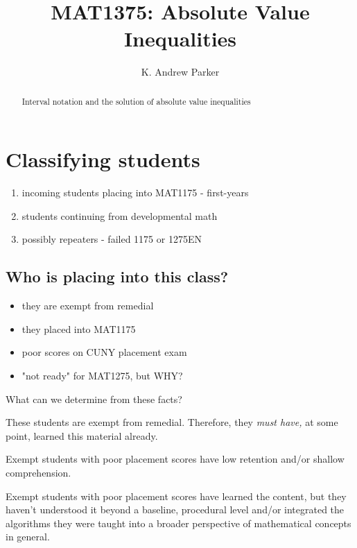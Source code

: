 \documentclass{ximera}
\title{MAT1375: Absolute Value Inequalities}
\author{K. Andrew Parker}
\begin{document}
\begin{abstract}
Interval notation and the solution of absolute value inequalities
\end{abstract}

\maketitle



\section{Classifying students}

\begin{enumerate}
\item incoming students placing into MAT1175 - first-years
\item students continuing from developmental math
\item possibly repeaters - failed 1175 or 1275EN
\end{enumerate}

\subsection{Who is placing into this class?}

\begin{itemize}
\item they are exempt from remedial
\item they placed into MAT1175
\item poor scores on CUNY placement exam
\item "not ready" for MAT1275, but WHY?
\end{itemize}

What can we determine from these facts?

\begin{lemma}
These students are exempt from remedial. Therefore, they \emph{must have,} at some point, learned this material already.
\end{lemma}

\begin{lemma}
Exempt students with poor placement scores have low retention and/or shallow comprehension.
\end{lemma}

\begin{theorem}
Exempt students with poor placement scores have learned the content, 
but they haven't understood it beyond a baseline, procedural level 
and/or integrated the algorithms they were taught into a broader perspective 
of mathematical concepts in general.
\end{theorem}
\end{document}
